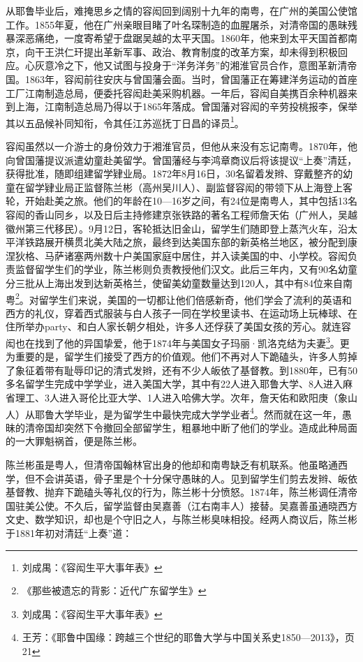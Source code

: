 从耶鲁毕业后，难掩思乡之情的容闳回到阔别十九年的南粤，在广州的美国公使馆工作。1855年夏，他在广州亲眼目睹了叶名琛制造的血腥屠杀，对清帝国的愚昧残暴深恶痛绝，一度寄希望于盘踞吴越的太平天国。1860年，他来到太平天国首都南京，向干王洪仁玕提出革新军事、政治、教育制度的改革方案，却未得到积极回应。心灰意冷之下，他又试图与投身于“洋务洋务”的湘淮官员合作，意图革新清帝国。1863年，容闳前往安庆与曾国藩会面。当时，曾国藩正在筹建洋务运动的首座工厂江南制造总局，便委托容闳赴美采购机器。一年后，容闳自美携百余种机器来到上海，江南制造总局乃得以于1865年落成。曾国藩对容闳的辛劳投桃报李，保举其以五品候补同知衔，令其任江苏巡抚丁日昌的译员\footnote{刘成禺：《容闳生平大事年表》}。

容闳虽然以一介游士的身份效力于湘淮官员，但他从来没有忘记南粤。1870年，他向曾国藩提议派遣幼童赴美留学。曾国藩经与李鸿章商议后将该提议“上奏”清廷，获得批准，随即组建留学肄业局。1872年8月16日，30名留着发辫、穿戴整齐的幼童在留学肄业局正监督陈兰彬（高州吴川人）、副监督容闳的带领下从上海登上客轮，开始赴美之旅。他们的年龄在10—16岁之间，有24位是南粤人，其中包括13名容闳的香山同乡，以及日后主持修建京张铁路的著名工程师詹天佑（广州人，吴越徽州第三代移民）。9月12日，客轮抵达旧金山，留学生们随即登上蒸汽火车，沿太平洋铁路展开横贯北美大陆之旅，最终到达美国东部的新英格兰地区，被分配到康涅狄格、马萨诸塞两州数十户美国家庭中居住，并入读美国的中、小学校。容闳负责监督留学生们的学业，陈兰彬则负责教授他们汉文。此后三年内，又有90名幼童分三批从上海出发到达新英格兰，使留美幼童数量达到120人，其中有84位来自南粤\footnote{《那些被遗忘的背影：近代广东留学生》}。对留学生们来说，美国的一切都让他们倍感新奇，他们学会了流利的英语和西方的礼仪，穿着西式服装与白人孩子一同在学校里读书、在运动场上玩棒球、在住所举办party、和白人家长朝夕相处，许多人还俘获了美国女孩的芳心。就连容闳也在找到了他的异国挚爱，他于1874年与美国女子玛丽·凯洛克结为夫妻\footnote{刘成禺：《容闳生平大事年表》}。更为重要的是，留学生们接受了西方的价值观。他们不再对人下跪磕头，许多人剪掉了象征着带有耻辱印记的清式发辫，还有不少人皈依了基督教。到1880年，已有50多名留学生完成中学学业，进入美国大学，其中有22人进入耶鲁大学、8人进入麻省理工、3人进入哥伦比亚大学、1人进入哈佛大学。次年，詹天佑和欧阳庚（象山人）从耶鲁大学毕业，是为留学生中最快完成大学学业者\footnote{王芳：《耶鲁中国缘：跨越三个世纪的耶鲁大学与中国关系史1850—2013》，页21}。然而就在这一年，愚昧的清帝国却突然下令撤回全部留学生，粗暴地中断了他们的学业。造成此种局面的一大罪魁祸首，便是陈兰彬。

陈兰彬虽是粤人，但清帝国翰林官出身的他却和南粤缺乏有机联系。他虽略通西学，但不会讲英语，骨子里是个十分保守愚昧的人。见到留学生们剪去发辫、皈依基督教、抛弃下跪磕头等礼仪的行为，陈兰彬十分愤怒。1874年，陈兰彬调任清帝国驻美公使。不久后，留学监督由吴嘉善（江右南丰人）接替。吴嘉善虽通晓西方文史、数学知识，却也是个守旧之人，与陈兰彬臭味相投。经两人商议后，陈兰彬于1881年初对清廷“上奏”道：

